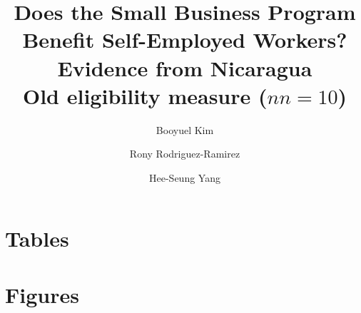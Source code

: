 \documentclass{article}
\begin{document}
\title{Does the Small Business Program Benefit Self-Employed Workers?  Evidence from Nicaragua \\ Old eligibility measure ($nn = 10$)} 
\author{Booyuel Kim \and Rony Rodriguez-Ramirez \and Hee-Seung Yang}
\maketitle
\listoftables
\listoffigures
\section{Tables}


\newpage 
\section{Figures}


\end{document}
